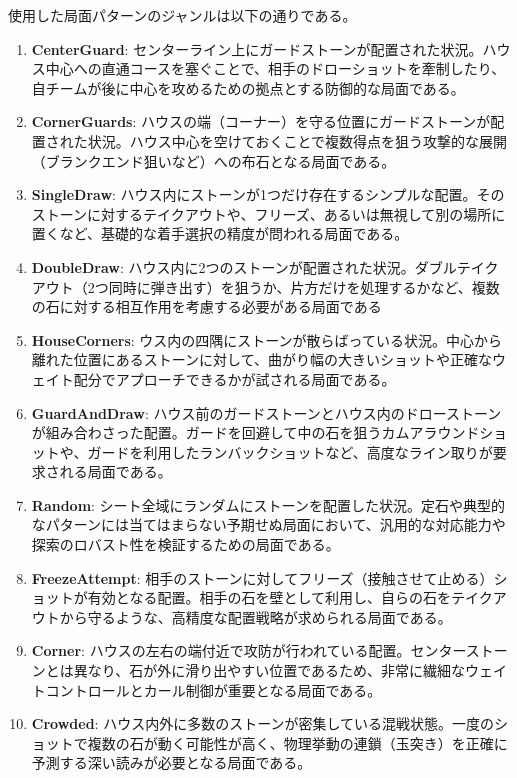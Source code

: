 \documentclass[11pt,a4j]{jreport}
\begin{document}
使用した局面パターンのジャンルは以下の通りである。
\begin{enumerate}
    \item \textbf{CenterGuard}: センターライン上にガードストーンが配置された状況。ハウス中心への直通コースを塞ぐことで、相手のドローショットを牽制したり、自チームが後に中心を攻めるための拠点とする防御的な局面である。
    \item \textbf{CornerGuards}:  ハウスの端（コーナー）を守る位置にガードストーンが配置された状況。ハウス中心を空けておくことで複数得点を狙う攻撃的な展開（ブランクエンド狙いなど）への布石となる局面である。
    \item \textbf{SingleDraw}: ハウス内にストーンが1つだけ存在するシンプルな配置。そのストーンに対するテイクアウトや、フリーズ、あるいは無視して別の場所に置くなど、基礎的な着手選択の精度が問われる局面である。
    \item \textbf{DoubleDraw}: ハウス内に2つのストーンが配置された状況。ダブルテイクアウト（2つ同時に弾き出す）を狙うか、片方だけを処理するかなど、複数の石に対する相互作用を考慮する必要がある局面である
    \item \textbf{HouseCorners}: ウス内の四隅にストーンが散らばっている状況。中心から離れた位置にあるストーンに対して、曲がり幅の大きいショットや正確なウェイト配分でアプローチできるかが試される局面である。
    \item \textbf{GuardAndDraw}: ハウス前のガードストーンとハウス内のドローストーンが組み合わさった配置。ガードを回避して中の石を狙うカムアラウンドショットや、ガードを利用したランバックショットなど、高度なライン取りが要求される局面である。
    \item \textbf{Random}: シート全域にランダムにストーンを配置した状況。定石や典型的なパターンには当てはまらない予期せぬ局面において、汎用的な対応能力や探索のロバスト性を検証するための局面である。
    \item \textbf{FreezeAttempt}: 相手のストーンに対してフリーズ（接触させて止める）ショットが有効となる配置。相手の石を壁として利用し、自らの石をテイクアウトから守るような、高精度な配置戦略が求められる局面である。
    \item \textbf{Corner}:  ハウスの左右の端付近で攻防が行われている配置。センターストーンとは異なり、石が外に滑り出やすい位置であるため、非常に繊細なウェイトコントロールとカール制御が重要となる局面である。
    \item \textbf{Crowded}: ハウス内外に多数のストーンが密集している混戦状態。一度のショットで複数の石が動く可能性が高く、物理挙動の連鎖（玉突き）を正確に予測する深い読みが必要となる局面である。
\end{enumerate}
\end{document}
